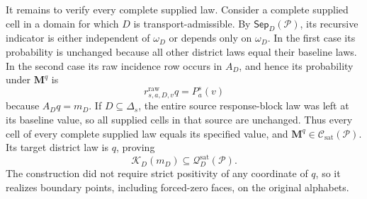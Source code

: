It remains to verify every complete supplied law.  Consider a complete supplied cell in a domain for which \(D\) is transport-admissible.  By \(\mathsf{Sep}_D(\mathcal P)\), its recursive indicator is either independent of \(\omega_D\) or depends only on \(\omega_D\).  In the first case its probability is unchanged because all other district laws equal their baseline laws.  In the second case its raw incidence row occurs in \(A_D\), and hence its probability under \(\mathbf M^q\) is
\[
r^{\mathrm{raw}}_{s,a,D,v}q=P_a^s(v)
\]
because \(A_Dq=m_D\).  If \(D\subseteq\Delta_s\), the entire source response-block law was left at its baseline value, so all supplied cells in that source are unchanged.  Thus every cell of every complete supplied law equals its specified value, and \(\mathbf M^q\in\mathcal C_{\mathrm{sat}}(\mathcal P)\).  Its target district law is \(q\), proving
\[
\mathcal K_D(m_D)\subseteq\mathcal Q_D^{\mathrm{sat}}(\mathcal P).
\]
The construction did not require strict positivity of any coordinate of \(q\), so it realizes boundary points, including forced-zero faces, on the original alphabets.